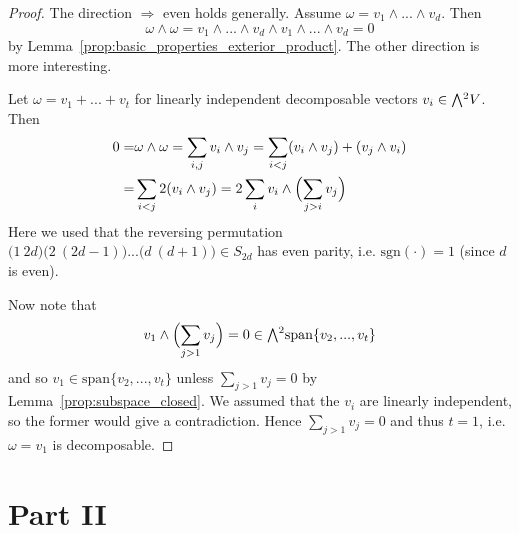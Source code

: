 \documentclass{scrartcl}
\newcommand{\sgn}{\mathrm{sgn}}
\newcommand{\extpow}{\mathchoice{{\textstyle\bigwedge}}
    {{\bigwedge}}
    {{\textstyle\wedge}}
    {{\scriptstyle\wedge}}}
\newcommand{\vspan}{\mathrm{span}}
\theoremstyle{definition}
\begin{document}
\begin{proof}
    The direction $\Rightarrow$ even holds generally. Assume $\omega = v_1 \wedge ... \wedge v_d$.
    Then
    \begin{equation*}
        \omega \wedge \omega = v_1 \wedge ... \wedge v_d \wedge v_1 \wedge ... \wedge v_d = 0
    \end{equation*}
    by Lemma~\ref{prop:basic_properties_exterior_product}. 
    The other direction is more interesting.

    Let $\omega = v_1 + ... + v_t$ for linearly independent decomposable vectors $v_i \in \extpow^2 V$.
    Then
    \begin{align*}
        0 =& \omega \wedge \omega = \sum_{i, j} v_i \wedge v_j = \sum_{i < j} (v_i \wedge v_j) + (v_j \wedge v_i) \\
        =& \sum_{i < j} 2(v_i \wedge v_j) = 2\sum_i v_i \wedge \Bigl( \sum_{j > i} v_j \Bigr)
    \end{align*}
    Here we used that the reversing permutation $\bigl(1 \ 2d\bigr)\bigl(2 \ (2d - 1)\bigr)...\bigl(d \ (d + 1)\bigr) \in S_{2d}$ has even parity, i.e. $\sgn(\cdot) = 1$ (since $d$ is even).

    Now note that
    \begin{equation*}
        v_1 \wedge \Bigl( \sum_{j > 1} v_j \Bigr) = 0 \in \extpow^2 \vspan\{v_2, ..., v_t\}
    \end{equation*}
    and so $v_1 \in \vspan\{v_2, ..., v_t\}$ unless $\sum_{j > 1} v_j = 0$ by Lemma~\ref{prop:subspace_closed}.
    We assumed that the $v_i$ are linearly independent, so the former would give a contradiction.
    Hence $\sum_{j > 1} v_j = 0$ and thus $t = 1$, i.e. $\omega = v_1$ is decomposable.
\end{proof}

\section{Part II}
\end{document}
